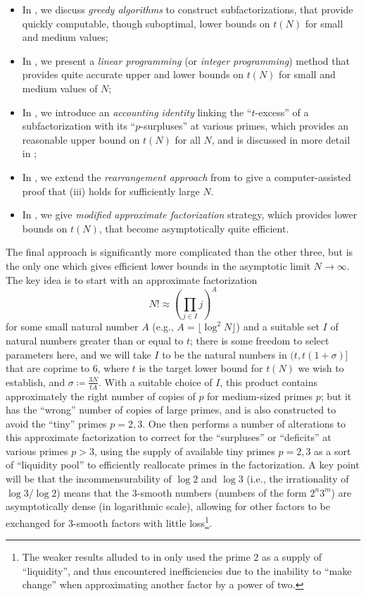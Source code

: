 \documentclass[12pt,a4paper,reqno]{amsart}
\numberwithin{equation}{section}
\theoremstyle{plain}
\theoremstyle{definition}
\begin{document}
\begin{itemize}
  \item In , we discuss \emph{greedy algorithms} to construct subfactorizations, that provide quickly computable, though suboptimal, lower bounds on $t(N)$ for small and medium values;
  \item In , we present a \emph{linear programming} (or \emph{integer programming}) method that provides quite accurate upper and lower bounds on $t(N)$ for small and medium values of $N$;
  \item In , we introduce an \emph{accounting identity} linking the ``$t$-excess'' of a subfactorization with its ``$p$-surpluses'' at various primes, which provides an reasonable upper bound on $t(N)$ for all $N$, and is discussed in more detail in ;
  \item In , we extend the \emph{rearrangement approach} from \cite{guy-selfridge} to give a computer-assisted proof that (iii) holds for sufficiently large $N$.
  \item In , we give \emph{modified approximate factorization} strategy, which provides lower bounds on $t(N)$, that become asymptotically quite efficient.
\end{itemize}

The final approach is significantly more complicated than the other three, but is the only one which gives efficient lower bounds in the asymptotic limit $N \to \infty$.  The key idea is to start with an approximate factorization
$$ N! \approx \left(\prod_{j \in I} j\right)^A$$
for some small natural number $A$ (e.g., $A = \lfloor \log^2 N \rfloor$) and a suitable set $I$ of natural numbers greater than or equal to $t$; there is some freedom to select parameters here, and we will take $I$ to be the natural numbers in $(t, t(1+\sigma)]$ that are coprime to $6$, where $t$ is the target lower bound for $t(N)$ we wish to establish, and $\sigma \coloneqq \frac{3N}{tA}$.  With a suitable choice of $I$, this product contains approximately the right number of copies of $p$ for medium-sized primes $p$; but it has the ``wrong'' number of copies of large primes, and is also constructed to avoid the ``tiny'' primes $p=2,3$.  One then performs a number of alterations to this approximate factorization to correct for the ``surpluses'' or ``deficits'' at various primes $p>3$, using the supply of available tiny primes $p=2,3$ as a sort of ``liquidity pool'' to efficiently reallocate primes in the factorization.  A key point will be that the incommensurability of $\log 2$ and $\log 3$ (i.e., the irrationality of $\log 3/\log 2$) means that the $3$-smooth numbers (numbers of the form $2^n 3^m$) are asymptotically dense (in logarithmic scale), allowing for other factors to be exchanged for $3$-smooth factors with little loss\footnote{The weaker results alluded to in  only used the prime $2$ as a supply of ``liquidity'', and thus encountered inefficiencies due to the inability to ``make change'' when approximating another factor by a power of two.}.
\end{document}
